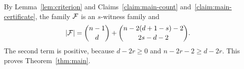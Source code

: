 By Lemma~\ref{lem:criterion} and Claims~\ref{claim:main-count} and~\ref{claim:main-certificate}, the family \(\mathcal{F}\) is an \(s\)-witness family and
\[
|\mathcal{F}|=\binom{n-1}{d}+\binom{n-2(d+1-s)-2}{2s-d-2}.
\]
The second term is positive, because \(d-2r\ge0\) and \(n-2r-2\ge d-2r\). This proves Theorem~\ref{thm:main}.
